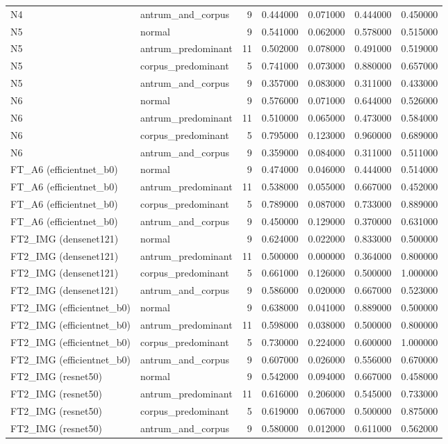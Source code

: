\begin{table}
\begin{tabular}{llrrrrr}
N4 & antrum\_and\_corpus & 9 & 0.444000 & 0.071000 & 0.444000 & 0.450000 \\
N5 & normal & 9 & 0.541000 & 0.062000 & 0.578000 & 0.515000 \\
N5 & antrum\_predominant & 11 & 0.502000 & 0.078000 & 0.491000 & 0.519000 \\
N5 & corpus\_predominant & 5 & 0.741000 & 0.073000 & 0.880000 & 0.657000 \\
N5 & antrum\_and\_corpus & 9 & 0.357000 & 0.083000 & 0.311000 & 0.433000 \\
N6 & normal & 9 & 0.576000 & 0.071000 & 0.644000 & 0.526000 \\
N6 & antrum\_predominant & 11 & 0.510000 & 0.065000 & 0.473000 & 0.584000 \\
N6 & corpus\_predominant & 5 & 0.795000 & 0.123000 & 0.960000 & 0.689000 \\
N6 & antrum\_and\_corpus & 9 & 0.359000 & 0.084000 & 0.311000 & 0.511000 \\
FT\_A6 (efficientnet\_b0) & normal & 9 & 0.474000 & 0.046000 & 0.444000 & 0.514000 \\
FT\_A6 (efficientnet\_b0) & antrum\_predominant & 11 & 0.538000 & 0.055000 & 0.667000 & 0.452000 \\
FT\_A6 (efficientnet\_b0) & corpus\_predominant & 5 & 0.789000 & 0.087000 & 0.733000 & 0.889000 \\
FT\_A6 (efficientnet\_b0) & antrum\_and\_corpus & 9 & 0.450000 & 0.129000 & 0.370000 & 0.631000 \\
FT2\_IMG (densenet121) & normal & 9 & 0.624000 & 0.022000 & 0.833000 & 0.500000 \\
FT2\_IMG (densenet121) & antrum\_predominant & 11 & 0.500000 & 0.000000 & 0.364000 & 0.800000 \\
FT2\_IMG (densenet121) & corpus\_predominant & 5 & 0.661000 & 0.126000 & 0.500000 & 1.000000 \\
FT2\_IMG (densenet121) & antrum\_and\_corpus & 9 & 0.586000 & 0.020000 & 0.667000 & 0.523000 \\
FT2\_IMG (efficientnet\_b0) & normal & 9 & 0.638000 & 0.041000 & 0.889000 & 0.500000 \\
FT2\_IMG (efficientnet\_b0) & antrum\_predominant & 11 & 0.598000 & 0.038000 & 0.500000 & 0.800000 \\
FT2\_IMG (efficientnet\_b0) & corpus\_predominant & 5 & 0.730000 & 0.224000 & 0.600000 & 1.000000 \\
FT2\_IMG (efficientnet\_b0) & antrum\_and\_corpus & 9 & 0.607000 & 0.026000 & 0.556000 & 0.670000 \\
FT2\_IMG (resnet50) & normal & 9 & 0.542000 & 0.094000 & 0.667000 & 0.458000 \\
FT2\_IMG (resnet50) & antrum\_predominant & 11 & 0.616000 & 0.206000 & 0.545000 & 0.733000 \\
FT2\_IMG (resnet50) & corpus\_predominant & 5 & 0.619000 & 0.067000 & 0.500000 & 0.875000 \\
FT2\_IMG (resnet50) & antrum\_and\_corpus & 9 & 0.580000 & 0.012000 & 0.611000 & 0.562000 \\
\bottomrule
\end{tabular}
\end{table}
